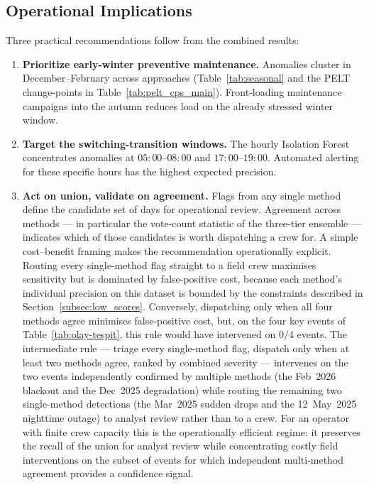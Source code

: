 \documentclass{article}
\begin{document}
\subsection{Operational Implications}

Three practical recommendations follow from the combined results:

\begin{enumerate}[leftmargin=1.5em,itemsep=2pt]
  \item \textbf{Prioritize early-winter preventive maintenance.} Anomalies cluster in December--February across approaches (Table~\ref{tab:seasonal} and the PELT change-points in Table~\ref{tab:pelt_cps_main}). Front-loading maintenance campaigns into the autumn reduces load on the already stressed winter window.

  \item \textbf{Target the switching-transition windows.} The hourly Isolation Forest concentrates anomalies at $05{:}00$--$08{:}00$ and $17{:}00$--$19{:}00$. Automated alerting for these specific hours has the highest expected precision.

  \item \textbf{Act on union, validate on agreement.} Flags from any single method define the candidate set of days for operational review. Agreement across methods --- in particular the vote-count statistic of the three-tier ensemble --- indicates which of those candidates is worth dispatching a crew for. A simple cost--benefit framing makes the recommendation operationally explicit. Routing every single-method flag straight to a field crew maximises sensitivity but is dominated by false-positive cost, because each method's individual precision on this dataset is bounded by the constraints described in Section~\ref{subsec:low_scores}. Conversely, dispatching only when all four methods agree minimises false-positive cost, but, on the four key events of Table~\ref{tab:olay-tespit}, this rule would have intervened on $0/4$ events. The intermediate rule --- triage every single-method flag, dispatch only when at least two methods agree, ranked by combined severity --- intervenes on the two events independently confirmed by multiple methods (the Feb~2026 blackout and the Dec~2025 degradation) while routing the remaining two single-method detections (the Mar~2025 sudden drops and the 12~May~2025 nighttime outage) to analyst review rather than to a crew. For an operator with finite crew capacity this is the operationally efficient regime: it preserves the recall of the union for analyst review while concentrating costly field interventions on the subset of events for which independent multi-method agreement provides a confidence signal.
\end{enumerate}
\end{document}
